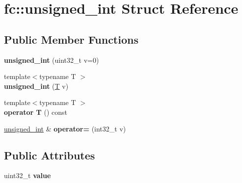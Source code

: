 \hypertarget{structfc_1_1unsigned__int}{}\section{fc\+:\+:unsigned\+\_\+int Struct Reference}
\label{structfc_1_1unsigned__int}
\subsection*{Public Member Functions}
\begin{DoxyCompactItemize}
\item 
\mbox{\label{structfc_1_1unsigned__int_a45db063259bc74d189c1c3f09734b8b5}} 
{\bfseries unsigned\+\_\+int} (uint32\+\_\+t v=0)
\item 
\mbox{\label{structfc_1_1unsigned__int_a3524d157681d2c64a062c2ce4f70ada7}} 
{\footnotesize template$<$typename T $>$ }\\{\bfseries unsigned\+\_\+int} (\mbox{\hyperlink{struct_t}{T}} v)
\item 
\mbox{\label{structfc_1_1unsigned__int_aa37f0e53dbe5d7ae629e2ec8b65c4429}} 
{\footnotesize template$<$typename T $>$ }\\{\bfseries operator T} () const
\item 
\mbox{\label{structfc_1_1unsigned__int_a21d7afe378188145a3a6b5f0784fe43a}} 
\mbox{\hyperlink{structfc_1_1unsigned__int}{unsigned\+\_\+int}} \& {\bfseries operator=} (int32\+\_\+t v)
\end{DoxyCompactItemize}
\subsection*{Public Attributes}
\begin{DoxyCompactItemize}
\item 
\mbox{\label{structfc_1_1unsigned__int_ac54ac972d3e38a5852616aaee955ff3f}} 
uint32\+\_\+t {\bfseries value}
\end{DoxyCompactItemize}
